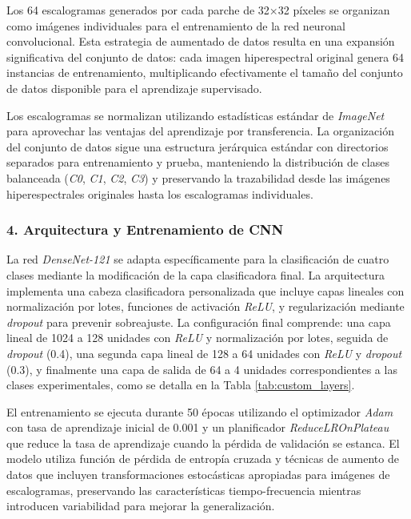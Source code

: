 Los 64 escalogramas generados por cada parche de 32×32 píxeles se organizan como imágenes individuales para el entrenamiento de la red neuronal convolucional. Esta estrategia de aumentado de datos resulta en una expansión significativa del conjunto de datos: cada imagen hiperespectral original genera 64 instancias de entrenamiento, multiplicando efectivamente el tamaño del conjunto de datos disponible para el aprendizaje supervisado.

\vspace{5mm}

Los escalogramas se normalizan utilizando estadísticas estándar de \emph{ImageNet} para aprovechar las ventajas del aprendizaje por transferencia. La organización del conjunto de datos sigue una estructura jerárquica estándar con directorios separados para entrenamiento y prueba, manteniendo la distribución de clases balanceada (\emph{C0}, \emph{C1}, \emph{C2}, \emph{C3}) y preservando la trazabilidad desde las imágenes hiperespectrales originales hasta los escalogramas individuales.

\subsubsection{4. Arquitectura y Entrenamiento de CNN}

La red \emph{DenseNet-121} se adapta específicamente para la clasificación de cuatro clases mediante la modificación de la capa clasificadora final. La arquitectura implementa una cabeza clasificadora personalizada que incluye capas lineales con normalización por lotes, funciones de activación \emph{ReLU}, y regularización mediante \emph{dropout} para prevenir sobreajuste. La configuración final comprende: una capa lineal de 1024 a 128 unidades con \emph{ReLU} y normalización por lotes, seguida de \emph{dropout} (0.4), una segunda capa lineal de 128 a 64 unidades con \emph{ReLU} y \emph{dropout} (0.3), y finalmente una capa de salida de 64 a 4 unidades correspondientes a las clases experimentales, como se detalla en la Tabla \ref{tab:custom_layers}.

\vspace{5mm}

El entrenamiento se ejecuta durante 50 épocas utilizando el optimizador \emph{Adam} con tasa de aprendizaje inicial de 0.001 y un planificador \emph{ReduceLROnPlateau} que reduce la tasa de aprendizaje cuando la pérdida de validación se estanca. El modelo utiliza función de pérdida de entropía cruzada y técnicas de aumento de datos que incluyen transformaciones estocásticas apropiadas para imágenes de escalogramas, preservando las características tiempo-frecuencia mientras introducen variabilidad para mejorar la generalización.

